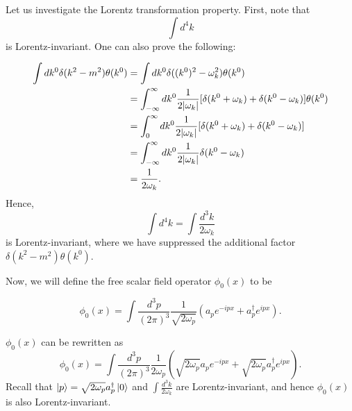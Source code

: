 \documentclass[11pt]{article}
\theoremstyle{definition}
\begin{document}
\begin{tcolorbox}[breakable, colback=yellow!20!white, colframe=black, boxrule=1pt]
Let us investigate the Lorentz transformation property. First, note that 
\begin{equation}
    \int d^4k
\end{equation}
is Lorentz-invariant.
One can also prove the following:

\begin{align*}
    \int dk^0 \delta(k^2 - m^2) \theta(k^0) & = \int dk^0 \delta((k^0)^2 - \omega_k^2) \theta(k^0) \\
    & =\int^\infty_{-\infty} dk^0 \frac{1}{2\abs{\omega_k}}[\delta(k^0 + \omega_k) + \delta(k^0 - \omega_k)]\theta(k^0) \\
    & =\int^\infty_0 dk^0 \frac{1}{2\abs{\omega_k}}[\delta(k^0 + \omega_k) + \delta(k^0 - \omega_k)] \\
    & =\int^\infty_{-\infty} dk^0 \frac{1}{2\abs{\omega_k}}\delta(k^0 - \omega_k) \\
    & = \frac{1}{2\omega_k}.
\end{align*}
Hence,
\begin{equation}
    \int d^4k = \int \frac{d^3k}{2\omega_k}
\end{equation}
is Lorentz-invariant, where we have suppressed the additional factor $\delta(k^2 - m^2) \theta(k^0)$.
\end{tcolorbox}
Now, we will define the free scalar field operator $\phi_0(x)$ to be
\begin{shaded}
    \begin{equation}
        \phi_0(x) = \int \frac{d^3p}{(2\pi)^3} \frac{1}{\sqrt{2\omega_p}}(a_pe^{-ipx} + a_p^\dagger e^{ipx}).
    \end{equation}
\end{shaded}

\begin{tcolorbox}[breakable, colback=yellow!20!white, colframe=black, boxrule=1pt]
$\phi_0(x)$ can be rewritten as 
\begin{equation}
    \phi_0(x) = \int \frac{d^3p}{(2\pi)^3} \frac{1}{2\omega_p}(\sqrt{2\omega_p}a_pe^{-ipx} + \sqrt{2\omega_p}a_p^\dagger e^{ipx}).
\end{equation}
Recall that $\ket{p}=\sqrt{2\omega_p}a_p^\dagger\ket{0}$ and $\int \frac{d^3k}{2\omega_k}$ are Lorentz-invariant, and hence $\phi_0(x)$ is also Lorentz-invariant.
\end{tcolorbox}
\end{document}

